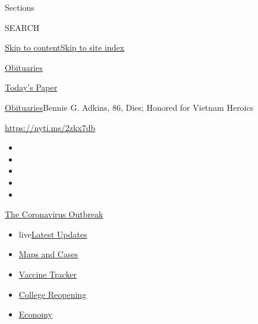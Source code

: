 Sections

SEARCH

\protect\hyperlink{site-content}{Skip to
content}\protect\hyperlink{site-index}{Skip to site index}

\href{https://www.nytimes3xbfgragh.onion/section/obituaries}{Obituaries}

\href{https://myaccount.nytimes3xbfgragh.onion/auth/login?response_type=cookie\&client_id=vi}{}

\href{https://www.nytimes3xbfgragh.onion/section/todayspaper}{Today's
Paper}

\href{/section/obituaries}{Obituaries}\textbar{}Bennie G. Adkins, 86,
Dies; Honored for Vietnam Heroics

\url{https://nyti.ms/2zkx7db}

\begin{itemize}
\item
\item
\item
\item
\item
\end{itemize}

\href{https://www.nytimes3xbfgragh.onion/news-event/coronavirus?action=click\&pgtype=Article\&state=default\&region=TOP_BANNER\&context=storylines_menu}{The
Coronavirus Outbreak}

\begin{itemize}
\tightlist
\item
  live\href{https://www.nytimes3xbfgragh.onion/2020/08/04/world/coronavirus-covid-19.html?action=click\&pgtype=Article\&state=default\&region=TOP_BANNER\&context=storylines_menu}{Latest
  Updates}
\item
  \href{https://www.nytimes3xbfgragh.onion/interactive/2020/us/coronavirus-us-cases.html?action=click\&pgtype=Article\&state=default\&region=TOP_BANNER\&context=storylines_menu}{Maps
  and Cases}
\item
  \href{https://www.nytimes3xbfgragh.onion/interactive/2020/science/coronavirus-vaccine-tracker.html?action=click\&pgtype=Article\&state=default\&region=TOP_BANNER\&context=storylines_menu}{Vaccine
  Tracker}
\item
  \href{https://www.nytimes3xbfgragh.onion/2020/08/02/us/covid-college-reopening.html?action=click\&pgtype=Article\&state=default\&region=TOP_BANNER\&context=storylines_menu}{College
  Reopening}
\item
  \href{https://www.nytimes3xbfgragh.onion/live/2020/08/03/business/stock-market-today-coronavirus?action=click\&pgtype=Article\&state=default\&region=TOP_BANNER\&context=storylines_menu}{Economy}
\end{itemize}

